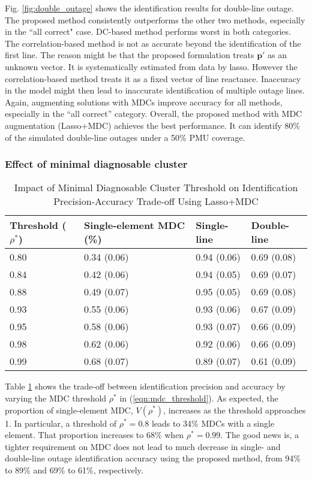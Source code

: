 Fig. \ref{fig:double_outage} shows the identification results for double-line outage. The proposed method consistently outperforms the other two methods, especially in the ``all correct" case. DC-based method performs worst in both categories. The correlation-based method is not as accurate beyond the identification of the first line. The reason might be that the proposed formulation treats $\boldsymbol{p}'$ as an unknown vector. It is systematically estimated from data by lasso. However the correlation-based method treats it as a fixed vector of line reactance. Inaccuracy in the model might then lead to inaccurate identification of multiple outage lines. Again, augmenting solutions with MDCs improve accuracy for all methods, especially in the ``all correct'' category. Overall, the proposed method with MDC augmentation (Lasso+MDC) achieves the best performance. It can identify 80\% of the simulated double-line outages under a 50\% PMU coverage.


\subsubsection{Effect of minimal diagnosable cluster}  

\begin{table}[htpb]
\caption{Impact of Minimal Diagnosable Cluster Threshold on Identification Precision-Accuracy Trade-off Using Lasso+MDC}
\label{tab:impact_mdc_threshold}
\centering
\begin{tabular}{llll}
\hline
\hline
Threshold ($\rho^*$)  & Single-element MDC (\%) & Single-line & Double-line \\
\hline
0.80 & 0.34 (0.06) & 0.94 (0.06) & 0.69 (0.08) \\
0.84 & 0.42 (0.06) & 0.94 (0.05) & 0.69 (0.07) \\
0.88 & 0.49 (0.07) & 0.95 (0.05) & 0.69 (0.08) \\
0.93 & 0.55 (0.06) & 0.93 (0.06) & 0.67 (0.09) \\
0.95 & 0.58 (0.06) & 0.93 (0.07) & 0.66 (0.09) \\
0.98 & 0.62 (0.06) & 0.92 (0.06) & 0.66 (0.09) \\
0.99 & 0.68 (0.07) & 0.89 (0.07) & 0.61 (0.09) \\
\hline 
\end{tabular}
\end{table}
Table \ref{tab:impact_mdc_threshold} shows the trade-off between identification precision and accuracy by varying the MDC threshold $\rho^*$ in (\ref{eqn:mdc_threshold}). As expected, the proportion of single-element MDC, $V(\rho^*)$, increases as the threshold approaches 1. In particular, a threshold of $\rho^* = 0.8$ leads to 34\% MDCs with a single element. That proportion increases to 68\% when $\rho^* = 0.99$. The good news is, a tighter requirement on MDC does not lead to much decrease in single- and double-line outage identification accuracy using the proposed method, from 94\% to 89\% and 69\% to 61\%, respectively. 

